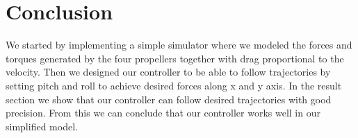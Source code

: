\documentclass[12pt,fleqn]{article}
\begin{document}
\section{Conclusion}
We started by implementing a simple simulator where we modeled the forces and torques generated by the four propellers together with drag proportional to the velocity. Then we designed our controller to be able to follow trajectories by setting pitch and roll to achieve desired forces along x and y axis. In the result section we show that our controller can follow desired trajectories with good precision. From this we can conclude that our controller works well in our simplified model.




\end{document}
